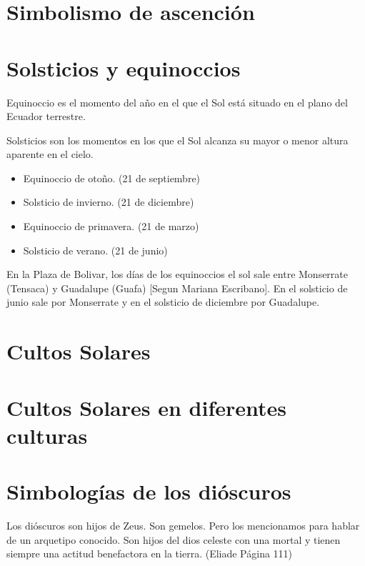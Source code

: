 \documentclass{report}
\begin{document}
\section*{Simbolismo de ascenci\'on}


\section*{Solsticios y equinoccios}

Equinoccio es el momento del a\~no en el que el Sol est\'a situado en
el plano del Ecuador terrestre.

Solsticios son los momentos en los que el Sol alcanza su mayor o menor
altura aparente en el cielo.

\begin{itemize}
\item Equinoccio de oto\~no. (21 de septiembre)
\item Solsticio de invierno. (21 de diciembre)
\item Equinoccio de primavera. (21 de marzo)
\item Solsticio de verano. (21 de junio)
\end{itemize}

En la Plaza de Bolivar, los d\'ias de los equinoccios el sol sale
entre Monserrate (Tensaca) y Guadalupe (Guafa) [Segun Mariana
  Escribano]. En el solsticio de junio sale por Monserrate y en el
solsticio de diciembre por Guadalupe. 

\section*{Cultos Solares}

\section*{Cultos Solares en diferentes culturas}

\section*{Simbolog\'ias de los di\'oscuros}

Los di\'oscuros son hijos de Zeus. Son gemelos. Pero los mencionamos
para hablar de un arquetipo conocido. Son hijos del dios celeste con
una mortal y tienen siempre una actitud benefactora en la
tierra. (Eliade P\'agina 111)
\end{document}
